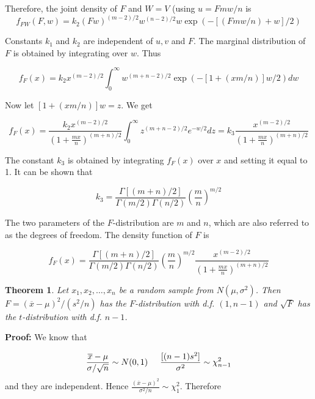 \documentclass{article}
\newtheorem{theorem}{Theorem}[section]
\begin{document}
 Therefore, the joint density of $F$ and $W=V$ (using $u=Fmw/n$ is
 \begin{equation*}
     f_{FW}(F,w)=k_2 (Fw)^{(m-2)/2}w^{(n-2)/2}w \exp{\left(-[(Fmw/n)+w]/2\right)}
 \end{equation*}

 Constants $k_1$ and $k_2$ are independent of $u,v$ and $F$. The marginal distribution of $F$ is obtained by integrating over $w$. Thus

 \begin{equation*}
     f_F(x)=k_2 x^{(m-2)/2} \int_0^{\infty} w^{(m+n-2)/2} \exp{(-[1+(xm/n)]w/2)}dw
 \end{equation*}

Now let \([1+(xm/n)]w=z\). We get

\begin{equation*}
     f_F(x)=\frac{k_2 x^{(m-2)/2}}{\left(1+\frac{mx}{n}\right)^{(m+n)/2}} \int_0^{\infty} z^{(m+n-2)/2} e^{-w/2} dz=k_3 \frac{x^{(m-2)/2}}{\left(1+\frac{mx}{n}\right)^{(m+n)/2}}
\end{equation*}

The constant $k_3$ is obtained by integrating $f_F(x)$ over $x$ and setting it equal to 1. It can be shown that

\begin{equation*}
    k_3=\frac{\Gamma[(m+n)/2]}{\Gamma(m/2)\Gamma(n/2)} \left(\frac{m}{n} \right)^{m/2}
\end{equation*}

The two parameters of the $F$-distribution are $m$ and $n$, which are also referred to as the degrees of freedom. The density function of $F$ is

\begin{equation*}
    f_F(x)= \frac{\Gamma[(m+n)/2]}{\Gamma(m/2)\Gamma(n/2)} \left(\frac{m}{n} \right)^{m/2} \frac{x^{(m-2)/2}}{\left(1+\frac{mx}{n}\right)^{(m+n)/2}}
\end{equation*}

\begin{theorem}
    Let \(x_1,x_2,\dots,x_n\) be a random sample from \(N(\mu,\sigma^2)\). Then \(F=(\overline{x}-\mu)^2/(s^2/n)\) has the $F$-distribution with d.f. $(1,n-1)$ and \(\sqrt{F}\) has the $t$-distribution with d.f. $n-1$.
\end{theorem}

\textbf{Proof:} We know that

\begin{equation*}
    \frac{\overline{x}-\mu}{\sigma/\sqrt{n}} \sim N(0,1) \hspace{0.5cm} \frac{[(n-1)s^2]}{\sigma^2}\sim\chi_{n-1}^{2}
\end{equation*}
and they are independent. Hence \( \frac{(\overline{x}-\mu)^2}{\sigma^2/n}\sim\chi_1^2\). Therefore
\end{document}
